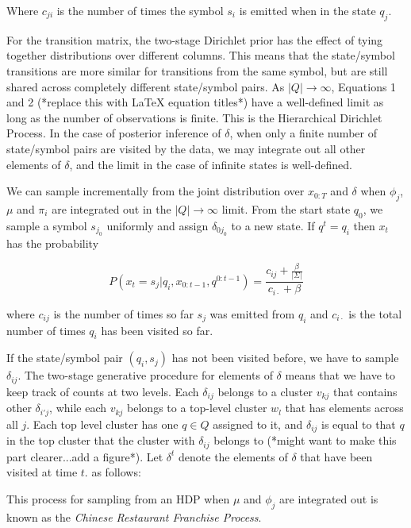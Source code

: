  Where $c_{ji}$ is the number of times the symbol $s_i$ is emitted when in the state $q_j$.  
 
 For the transition matrix, the two-stage Dirichlet prior has the effect of tying together distributions over different columns.  This means that the state/symbol transitions are more similar for transitions from the same symbol, but are still shared across completely different state/symbol pairs.  As $|Q|\rightarrow\infty$, Equations 1 and 2 (*replace this with LaTeX equation titles*) have a well-defined limit as long as the number of observations is finite.  This is the Hierarchical Dirichlet Process.  In the case of posterior inference of $\delta$, when only a finite number of state/symbol pairs are visited by the data, we may integrate out all other elements of $\delta$, and the limit in the case of infinite states is well-defined.
 
We can sample incrementally from the joint distribution over $x_{0:T}$ and $\delta$ when $\phi_j$, $\mu$ and $\pi_i$ are integrated out in the $|Q|\rightarrow\infty$ limit.  From the start state $q_0$, we sample a symbol $s_{j_0}$ uniformly and assign $\delta_{0j_0}$ to a new state.  If $q^t = q_i$ then $x_t$ has the probability

 \[P(x_t=s_j|q_i,x_{0:t-1},q^{0:t-1}) = \frac{c_{ij}+\frac{\beta}{|\Sigma|}}{c_{i\cdot} + \beta}\]
 
 where $c_{ij}$ is the number of times so far $s_j$ was emitted from $q_i$ and $c_{i\cdot}$ is the total number of times $q_i$ has been visited so far.  
 
If the state/symbol pair $(q_i,s_j)$ has not been visited before, we have to sample $\delta_{ij}$.  The two-stage generative procedure for elements of $\delta$ means that we have to keep track of counts at two levels.  Each $\delta_{ij}$ belongs to a cluster $v_{kj}$ that contains other $\delta_{i'j}$, while each $v_{kj}$ belongs to a top-level cluster $w_{l}$ that has elements across all $j$.  Each top level cluster has one $q \in Q$ assigned to it, and $\delta_{ij}$ is equal to that $q$ in the top cluster that the cluster with $\delta_{ij}$ belongs to (*might want to make this part clearer...add a figure*).  Let $\delta^t$ denote the elements of $\delta$ that have been visited at time $t$.  as follows:
 
 
 This process for sampling from an HDP when $\mu$ and $\phi_j$ are integrated out is known as the {\em Chinese Restaurant Franchise Process}.